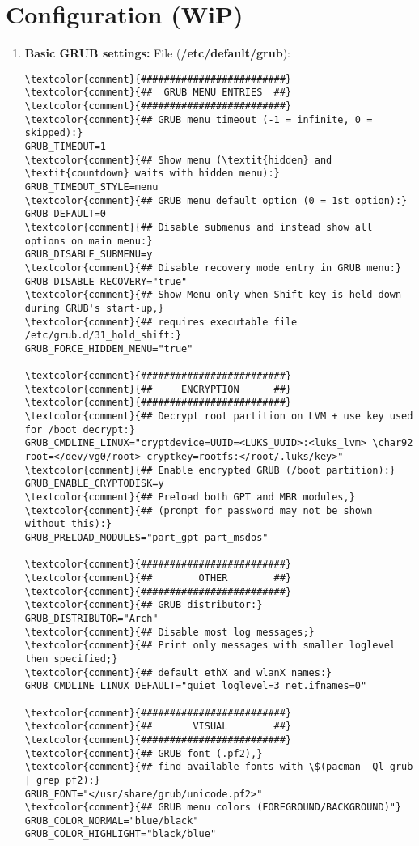 \documentclass[10pt, a4paper, onecolumn, openany]{book} %
\begin{document}
\section{Configuration (WiP)}
\begin{enumerate}
    \item \textbf{Basic GRUB settings:}
\newline File (\textbf{\textcolor{file}{/etc/default/grub}}):
\begin{Verbatim}[commandchars=\\\{\}]
\textcolor{comment}{#########################}
\textcolor{comment}{##  GRUB MENU ENTRIES  ##}
\textcolor{comment}{#########################}
\textcolor{comment}{## GRUB menu timeout (-1 = infinite, 0 = skipped):}
GRUB_TIMEOUT=1
\textcolor{comment}{## Show menu (\textit{hidden} and \textit{countdown} waits with hidden menu):}
GRUB_TIMEOUT_STYLE=menu
\textcolor{comment}{## GRUB menu default option (0 = 1st option):}
GRUB_DEFAULT=0
\textcolor{comment}{## Disable submenus and instead show all options on main menu:}
GRUB_DISABLE_SUBMENU=y
\textcolor{comment}{## Disable recovery mode entry in GRUB menu:}
GRUB_DISABLE_RECOVERY="true"
\textcolor{comment}{## Show Menu only when Shift key is held down during GRUB's start-up,}
\textcolor{comment}{## requires executable file /etc/grub.d/31_hold_shift:}
GRUB_FORCE_HIDDEN_MENU="true"

\textcolor{comment}{#########################}
\textcolor{comment}{##     ENCRYPTION      ##}
\textcolor{comment}{#########################}
\textcolor{comment}{## Decrypt root partition on LVM + use key used for /boot decrypt:}
GRUB_CMDLINE_LINUX="cryptdevice=UUID=<LUKS_UUID>:<luks_lvm> \char92 
root=</dev/vg0/root> cryptkey=rootfs:</root/.luks/key>"
\textcolor{comment}{## Enable encrypted GRUB (/boot partition):}
GRUB_ENABLE_CRYPTODISK=y
\textcolor{comment}{## Preload both GPT and MBR modules,}
\textcolor{comment}{## (prompt for password may not be shown without this):}
GRUB_PRELOAD_MODULES="part_gpt part_msdos"

\textcolor{comment}{#########################}
\textcolor{comment}{##        OTHER        ##}
\textcolor{comment}{#########################}
\textcolor{comment}{## GRUB distributor:}
GRUB_DISTRIBUTOR="Arch"
\textcolor{comment}{## Disable most log messages;}
\textcolor{comment}{## Print only messages with smaller loglevel then specified;}
\textcolor{comment}{## default ethX and wlanX names:}
GRUB_CMDLINE_LINUX_DEFAULT="quiet loglevel=3 net.ifnames=0"

\textcolor{comment}{#########################}
\textcolor{comment}{##       VISUAL        ##}
\textcolor{comment}{#########################}
\textcolor{comment}{## GRUB font (.pf2),}
\textcolor{comment}{## find available fonts with \$(pacman -Ql grub | grep pf2):}
GRUB_FONT="</usr/share/grub/unicode.pf2>"
\textcolor{comment}{## GRUB menu colors (FOREGROUND/BACKGROUND)"}
GRUB_COLOR_NORMAL="blue/black"
GRUB_COLOR_HIGHLIGHT="black/blue"


\end{Verbatim}
\end{enumerate}
\end{document}
